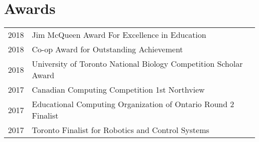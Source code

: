 \documentclass[]{chandan-cv}
\begin{document}
\begin{minipage}[t]{0.66\textwidth}
\section{Awards} 
\begin{tabular}{rll}
2018		&	Jim McQueen Award For Excellence in Education\\
2018		&	Co-op Award for Outstanding Achievement\\
2018		& 	University of Toronto National Biology Competition Scholar Award\\
2017		&	Canadian Computing Competition 1st Northview\\
2017		&	Educational Computing Organization of Ontario Round 2 Finalist\\
2017		&	Toronto Finalist for Robotics and Control Systems\\
\end{tabular}
\sectionsep

%
%

\end{minipage} 
\end{document}
